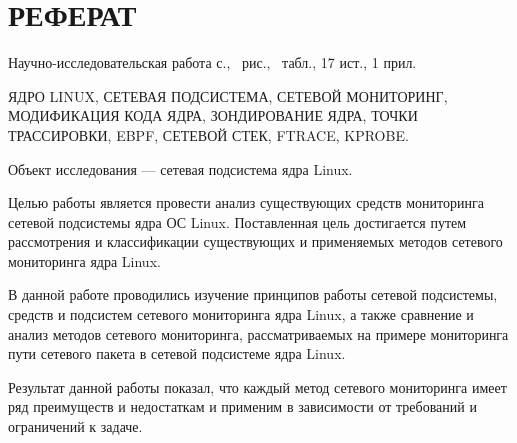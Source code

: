 \section*{\centering РЕФЕРАТ}
\setcounter{page}{2}

Научно-исследовательская работа \pageref{LastPage} с., \totalfigures\ рис., \totaltables\ табл., 17 ист., 1 прил.

ЯДРО LINUX, СЕТЕВАЯ ПОДСИСТЕМА, СЕТЕВОЙ МОНИТОРИНГ, МОДИФИКАЦИЯ КОДА ЯДРА, ЗОНДИРОВАНИЕ ЯДРА, ТОЧКИ ТРАССИРОВКИ, EBPF, СЕТЕВОЙ СТЕК, FTRACE, KPROBE.

Объект исследования --- сетевая подсистема ядра Linux.

Целью работы является провести анализ существующих средств мониторинга сетевой подсистемы ядра ОС Linux.
Поставленная цель достигается путем рассмотрения и классификации существующих и применяемых методов сетевого мониторинга ядра Linux.

В данной работе проводились изучение принципов работы сетевой подсистемы, средств и подсистем сетевого мониторинга ядра Linux, а также сравнение и анализ методов сетевого мониторинга, рассматриваемых на примере мониторинга пути сетевого пакета в сетевой подсистеме ядра Linux.  

Результат данной работы показал, что каждый метод сетевого мониторинга имеет ряд преимуществ и недостаткам и применим в зависимости от требований и ограничений к задаче.